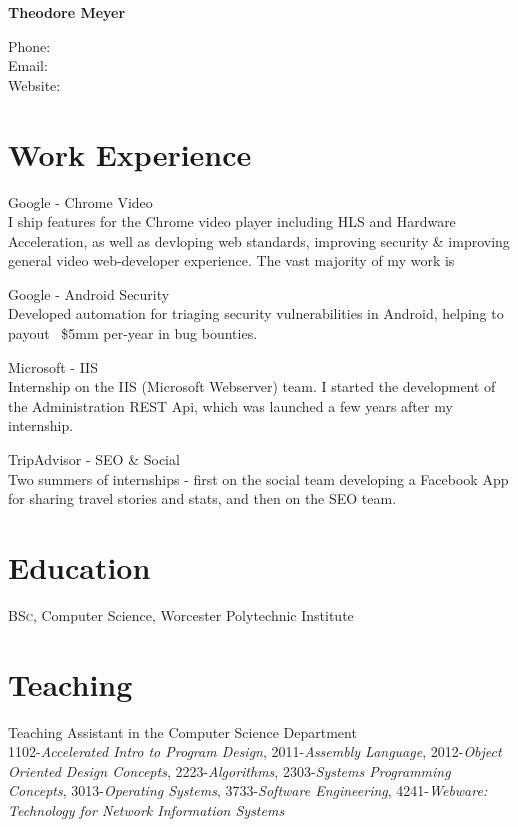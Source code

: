 \documentclass[11pt]{article}
\newcommand{\AuthorName}{Theodore Meyer}
\begin{document}
\verlag
{\LARGE\bfseries \AuthorName}
\medskip


Phone: \\
Email: \\
Website: 

\section*{Work Experience}

Google - Chrome Video\\ {
\footnotesize
I ship features for the Chrome video player including HLS and Hardware
Acceleration, as well as devloping web standards, improving security \&
improving general video web-developer experience. The vast majority of my work
is 
}

Google - Android Security\\ {
\footnotesize
Developed automation for triaging security vulnerabilities in Android, helping
to payout ~\$5mm per-year in bug bounties.
}

Microsoft - IIS\\ {
\footnotesize
Internship on the IIS (Microsoft Webserver) team. I started the development of
the Administration REST Api, which was launched a few years after my internship.
}

TripAdvisor - SEO \& Social\\ {
\footnotesize
Two summers of internships - first on the social team developing a Facebook
App for sharing travel stories and stats, and then on the SEO team.
}

\section*{Education}
\textsc{BSc}, Computer Science, Worcester Polytechnic Institute

\section*{Teaching}
Teaching Assistant in the Computer Science Department\\{
\footnotesize
1102-\textit{Accelerated Intro to Program Design}, 2011-\textit{Assembly Language}, 2012-\textit{Object Oriented Design Concepts}, 2223-\textit{Algorithms}, 2303-\textit{Systems Programming Concepts}, 3013-\textit{Operating Systems}, 3733-\textit{Software Engineering}, 4241-\textit{Webware: Technology for Network Information Systems} 
}
\end{document}
